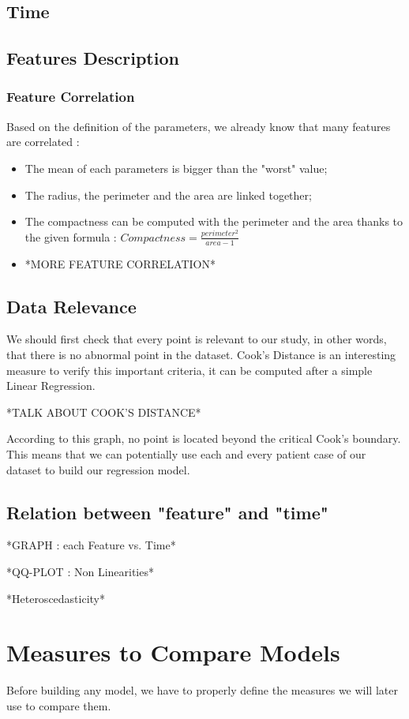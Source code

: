 \documentclass[]{report}
\begin{document}
\subsection{Time}

\subsection{Features Description}

\subsubsection{Feature Correlation}
Based on the definition of the parameters, we already know that many features are correlated :
\begin{itemize}
	\item The mean of each parameters is bigger than the "worst" value;
	\item The radius, the perimeter and the area are linked together;
	\item The compactness can be computed with the perimeter and the area thanks to the given formula : $Compactness = \frac{perimeter^2}{area - 1}$
	\item *MORE FEATURE CORRELATION*
\end{itemize}

\subsection{Data Relevance}
We should first check that every point is relevant to our study, in other words, that there is no abnormal point in the dataset. Cook's Distance is an interesting measure to verify this important criteria, it can be computed after a simple Linear Regression.

*TALK ABOUT COOK'S DISTANCE*

According to this graph, no point is located beyond the critical Cook's boundary. This means that we can potentially use each and every patient case of our dataset to build our regression model. 

\subsection{Relation between "feature" and "time"}
*GRAPH : each Feature vs. Time*

*QQ-PLOT : Non Linearities*

*Heteroscedasticity*


\section{Measures to Compare Models}
Before building any model, we have to properly define the measures we will later use to compare them. 
\end{document}
